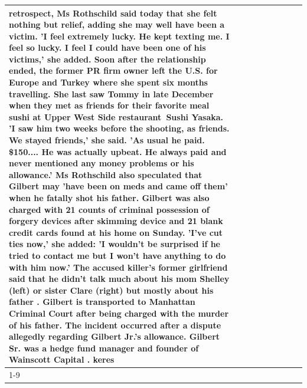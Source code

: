 \begin{table}[H]
\begin{tabular}{lllrlllll}
retrospect, Ms Rothschild said today that she felt nothing but relief, adding she may well have been a victim. 'I feel extremely lucky. He kept texting me. I feel so lucky. I feel I could have been one of his victims,' she added. Soon after the relationship ended, the former PR firm owner left the U.S. for Europe and Turkey where she spent six months  travelling. She last saw Tommy in late December when they met as friends for their favorite meal sushi at Upper West Side restaurant Sushi Yasaka. 'I saw him two weeks before the shooting, as friends. We stayed friends,' she said. 'As usual he paid. \$150.... He was actually upbeat. He always paid and never mentioned any money problems or his allowance.' Ms Rothschild also speculated that Gilbert may 'have been on meds and came off them' when he fatally shot his father. Gilbert was also charged with 21 counts of criminal possession of forgery devices after skimming device and 21 blank credit cards found at his home on Sunday. 'I've cut ties now,' she added: 'I wouldn’t be surprised if he tried to contact me but I won’t have anything to do with him now.' The accused killer's former girlfriend said that he didn't talk much about his mom Shelley (left) or sister Clare (right) but mostly about his father . Gilbert is transported to Manhattan Criminal Court  after being charged with the murder of his father. The incident occurred after a dispute allegedly regarding Gilbert Jr.'s allowance. Gilbert Sr. was a hedge fund manager and founder of Wainscott Capital . keres \\
\cline{1-9} \cline{2-9}

\end{tabular}
\end{table}
